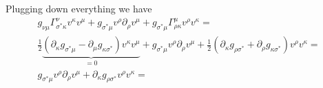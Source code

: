%
Plugging down everything we have
%
\begin{multline}
    g_{\nu \mu} \Gamma_{\sigma^\ast \kappa}^{\nu} v^\kappa  v^\mu +
    g_{\sigma^\ast \mu}  v^\rho \partial_\rho v^\mu + 
    g_{\sigma^\ast \mu} \Gamma_{\rho \kappa}^{\mu} v^\rho v^\kappa = \\
    \frac{1}{2} \underbrace{(\partial_\kappa g_{{\sigma^\ast}\mu} - 
    \partial_\mu g_{\kappa{\sigma^\ast}}) v^\kappa  v^\mu }_{ = 0} +
    g_{\sigma^\ast \mu}  v^\rho \partial_\rho v^\mu + 
    \frac{1}{2} (\partial_\kappa g_{{\rho}\sigma^\ast} +
    \partial_{\rho} g_{\kappa\sigma^\ast})  v^\rho v^\kappa = \\
    g_{\sigma^\ast \mu}  v^\rho \partial_\rho v^\mu + 
    \partial_\kappa g_{{\rho}\sigma^\ast} v^\rho v^\kappa = \\
\end{multline}
